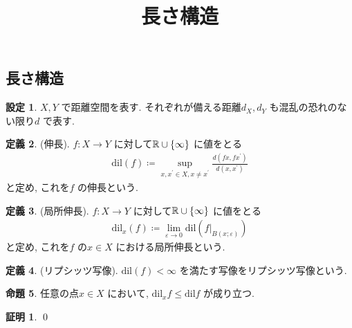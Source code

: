 \documentclass[platex, driver=dvipdfm, ja = standard, 10pt, fleqn, label-section=none]{bxjsarticle}
\title{長さ構造}
\date{}
\author{}
\theoremstyle{definition}
\newtheorem{dfn}{定義}[section]
\newtheorem{prop}[dfn]{命題}
\newtheorem{setting}[dfn]{設定}
\newtheorem*{pf*}{証明}
\newcommand{\veps}{\varepsilon}
\newcommand{\cbra}[1]{\mleft\{#1\mright\}}
\renewcommand{\;}{\, ; \,}
\begin{document}
\maketitle



\section{}

\subsection{長さ構造}

\begin{setting}
$X, Y$ で距離空間を表す. それぞれが備える距離$d_X, d_Y$ も混乱の恐れのない限り$d$ で表す. 

\end{setting}

\begin{dfn}(伸長). $f: X \rightarrow Y$ に対して$\mathbb R \cup \cbra{\infty}$ に値をとる
\begin{align*} \textrm{dil} (f) \coloneqq \sup_{x, x^\prime \in X, x \neq x^\prime } \frac{d(fx, fx^\prime )}{ d(x, x^\prime) } \end{align*} 
と定め, これを$f$ の伸長という. 

\end{dfn}

\begin{dfn}(局所伸長). $f: X \rightarrow Y$ に対して$\mathbb R \cup \cbra{\infty}$ に値をとる
\begin{align*} \textrm{dil}_x (f) \coloneqq \lim_{\veps \rightarrow 0} \textrm{dil}(f | _ {B(x; \veps)}) \end{align*} 
と定め, これを$f$ の$x \in X$ における局所伸長という. 

\end{dfn}

\begin{dfn}(リプシッツ写像). $\textrm{dil} (f) < \infty$ を満たす写像をリプシッツ写像という. 

\end{dfn}

\begin{prop}
任意の点$x \in X$ において, $\textrm{dil}_x f \leq \textrm{dil} f$ が成り立つ. 
\end{prop}
\begin{pf*}

\qed
\end{pf*}
\end{document}
